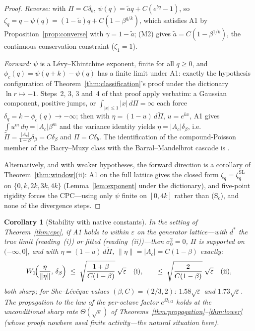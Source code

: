 \documentclass[pdflatex,sn-mathphys-num]{sn-jnl}
\theoremstyle{thmstyleone}
\newtheorem{corollary}[theorem]{Corollary}
\theoremstyle{thmstyletwo}
\theoremstyle{thmstylethree}
\begin{document}
\begin{proof}
\textit{Reverse:}  with $\Pi = C\delta_b$, $\psi(q) = \tilde aq +
C(e^{bq}-1)$, so $\zeta_q = q - \psi(q) = (1-\tilde a)q +
C(1-\beta^{q/k})$, which satisfies A1 by
Proposition~\ref{prop:converse} with $\gamma = 1 - \tilde a$; (M2)
gives $\tilde a = C(1-\beta^{1/k})$, the continuous conservation
constraint ($\zeta_1 = 1$).

\textit{Forward:}  $\psi$ is a L\'evy--Khintchine exponent, finite
for all $q \ge 0$, and $\phi_c(q) = \psi(q+k)-\psi(q)$ has a finite
limit under A1: exactly the hypothesis configuration of
Theorem~\ref{thm:classification}'s proof under the dictionary
$\ln r \mapsto -1$.  Steps~2, 3, 3\textonehalf{} and~4 of that proof
apply verbatim: a Gaussian component, positive jumps, or
$\int_{|x|\le1}|x|\,d\Pi = \infty$ each force $\delta_q = k -
\phi_c(q) \to -\infty$; then with $\eta = (1-u)\,d\tilde\Pi$,
$u = e^{kx}$, A1 gives $\int u^m\,d\eta = |A_c|\beta^m$ and the
variance identity yields $\eta = |A_c|\delta_\beta$, i.e.\
$\tilde\Pi = \frac{|A_c|}{1-\beta}\delta_\beta = C\delta_\beta$ and
$\Pi = C\delta_b$.  The identification of the compound-Poisson
member of the Bacry--Muzy class with the Barral--Mandelbrot cascade
is \cite{BM03}.

Alternatively, and with weaker hypotheses, the forward direction is
a corollary of Theorem~\ref{thm:window}(ii): A1 on the full lattice
gives the closed form $\zeta_q = \zeta^{\mathrm{SL}}_q$ on
$\{0, k, 2k, 3k, 4k\}$ (Lemma~\ref{lem:exponent} under the
dictionary),
and five-point rigidity forces the CPC---using only $\psi$ finite
on $[0,4k]$ rather than \textup{(S$_c$)}, and none of the
divergence steps.
\end{proof}

\begin{corollary}[Stability with native constants]\label{cor:mrmstab}
In the setting of Theorem~\textup{\ref{thm:cpc}}, if A1 holds to
within $\varepsilon$ on the generator lattice---with $d^*$ the true
limit (reading~(i)) or fitted (reading~(ii))---then $\sigma_0^2 =
0$, $\Pi$ is supported on $(-\infty,0]$, and with $\eta =
(1-u)\,d\tilde\Pi$, $\|\eta\| = |A_c| = C(1-\beta)$ exactly:
\[
  W_1\!\Bigl(\frac{\eta}{\|\eta\|},\,\delta_\beta\Bigr)
  \;\le\; \sqrt{\frac{1+\beta}{C(1-\beta)}}\;\sqrt{\varepsilon}
  \quad\textup{(i)},
  \qquad
  \le\; \sqrt{\frac{2}{C(1-\beta)}}\;\sqrt{\varepsilon}
  \quad\textup{(ii)},
\]
both sharp; for She--L\'ev\^eque values $(\beta, C) = (2/3, 2)$:
$1.58\sqrt\varepsilon$ and $1.73\sqrt\varepsilon$.  The propagation
to the law of the per-octave factor $e^{\Omega_{1/2}}$ holds at the
unconditional sharp rate $\Theta(\sqrt\varepsilon)$ of
Theorems~\ref{thm:propagation}--\ref{thm:lower} (whose proofs nowhere
used finite activity---the natural situation here).
\end{corollary}
\end{document}
